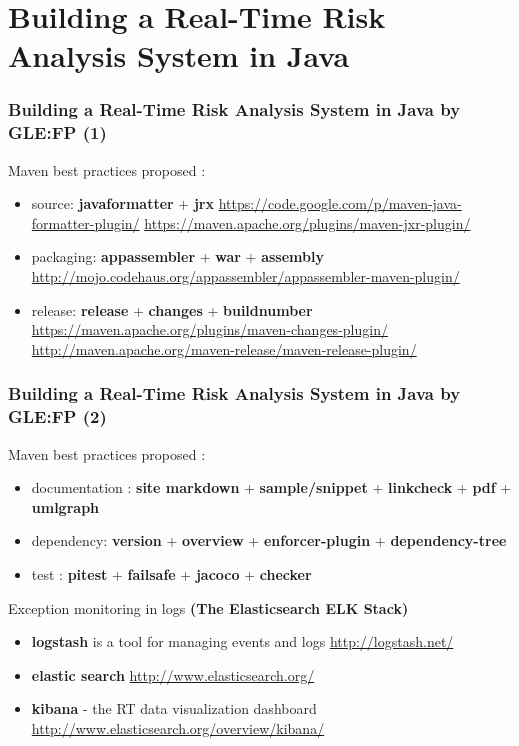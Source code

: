 \documentclass[presentation]{beamer}
\begin{document}
\section{Building a Real-Time Risk Analysis System in Java}

\begin{frame}
\frametitle{Building a Real-Time Risk Analysis System in Java by GLE:FP (1)}

Maven best practices proposed :
\begin{itemize}
\item source: \textbf{javaformatter} + \textbf{jrx}
\url{https://code.google.com/p/maven-java-formatter-plugin/}
\url{https://maven.apache.org/plugins/maven-jxr-plugin/}
\item packaging: \textbf{appassembler} + \textbf{war} + \textbf{assembly}
\url{http://mojo.codehaus.org/appassembler/appassembler-maven-plugin/}
\item release: \textbf{release} + \textbf{changes} + \textbf{buildnumber}
\url{https://maven.apache.org/plugins/maven-changes-plugin/}
\url{http://maven.apache.org/maven-release/maven-release-plugin/}
\end{itemize}

\end{frame}

\begin{frame}
\frametitle{Building a Real-Time Risk Analysis System in Java by GLE:FP (2)}

Maven best practices proposed :
\begin{itemize}
\item documentation : \textbf{site markdown} + \textbf{sample/snippet} + \textbf{linkcheck} + \textbf{pdf} + \textbf{umlgraph}
\item dependency: \textbf{version} + \textbf{overview} + \textbf{enforcer-plugin} + \textbf{dependency-tree} 
\item test : \textbf{pitest} + \textbf{failsafe} + \textbf{jacoco} + \textbf{checker}
\end{itemize}

Exception monitoring in logs \textbf{(The Elasticsearch ELK Stack)}
\begin{itemize}
\item \textbf{logstash} is a tool for managing events and logs
\url{http://logstash.net/}
\item \textbf{elastic search}
\url{http://www.elasticsearch.org/}
\item \textbf{kibana} - the RT data visualization dashboard
\url{http://www.elasticsearch.org/overview/kibana/}
\end{itemize}

\end{frame}
\end{document}
